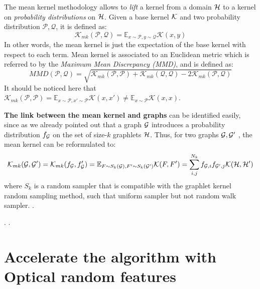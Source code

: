 The mean kernel methodology allows to \emph{lift} a kernel from a domain $\mathcal{H}$ to a kernel on \emph{probability distributions} on $\mathcal{H}$. Given a base kernel $\mathcal{K}$ and two probability distribution $\mathcal{P},\mathcal{Q}$, it is defined as:
\begin{equation}
\label{eq:mean_kernel}
\mathcal{K}_{mk}(\mathcal{P},\mathcal{Q}) = \mathbb{E}_{x \sim \mathcal{P}, y \sim \mathcal{Q}} \mathcal{K}(x,y)
\end{equation}
In other words, the mean kernel is just the expectation of the base kernel with respect to each term. Mean kernel is associated to an Euclidean metric which is referred to by the  \emph{Maximum Mean Discrepancy (MMD)}, and is defined as:
\begin{equation}\label{eq:MMD}
MMD(\mathcal{P},\mathcal{Q}) = \sqrt{\mathcal{K}_{mk}(\mathcal{P},\mathcal{P}) + \mathcal{K}_{mk}(\mathcal{Q},\mathcal{Q}) - 2\mathcal{K}_{mk}(\mathcal{P},\mathcal{Q})}
\end{equation}
It should be noticed here that $\mathcal{K}_{mk}(\mathcal{P},\mathcal{P}) = \mathbb{E}_{x \sim \mathcal{P}, x' \sim \mathcal{P}} \mathcal{K}(x,x') \neq \mathbb{E}_{x \sim \mathcal{P}} \mathcal{K}(x,x)$.

\textbf{The link between the mean kernel and graphs} can be identified easily, since as we already pointed out that a graph $\mathcal{G}$ introduces a probability distribution $f_{\mathcal{G}}$ on the set of size-$k$ graphlets $\mathcal{H}$. Thus, for two graphs $\mathcal{G},\mathcal{G}'$ , the mean kernel can be reformulated to:
\begin{equation}
\label{eq:mean_kernel_graphs}
\mathcal{K}_{mk}(\mathcal{G},\mathcal{G}') = \mathcal{K}_{mk}(f_{\mathcal{G}},f_{\mathcal{G}}')= \mathbb{E}_{F \sim S_k(\mathcal{G}), F' \sim S_k(\mathcal{G}')} \mathcal{K}(F,F')=\sum_{i,j}^{N_k}f_{\mathcal{G},i}f_{\mathcal{G}',j}\mathcal{K}(\mathcal{H},\mathcal{H}') 
\end{equation}
where $S_k$ is a random sampler that is compatible with the graphlet kernel random sampling method, such that uniform sampler but not random walk sampler.
.

.
.




\section{Accelerate the algorithm with Optical random features}


